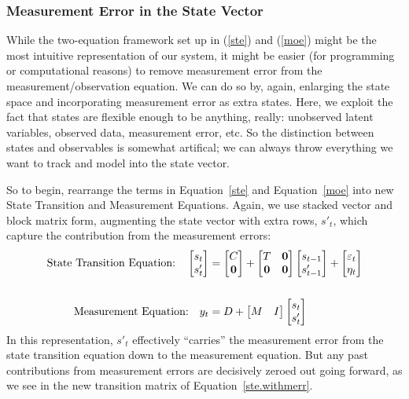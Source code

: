 \documentclass[a4paper,12pt]{article}
\begin{document}
\subsubsection{Measurement Error in the State Vector}

While the two-equation framework set up in (\ref{ste}) and (\ref{moe})
might be the most intuitive representation of our system, it might be
easier (for programming or computational reasons) to remove measurement
error from the measurement/observation equation. We can do so by, again,
enlarging the state space and incorporating measurement error as extra
states. Here, we exploit the fact that states are flexible enough to be
anything, really: unobserved latent variables, observed data,
measurement error, etc. So the distinction between states and
observables is somewhat artifical; we can always throw everything we
want to track and model into the state vector.

So to begin, rearrange the terms in Equation~\ref{ste} and
Equation~\ref{moe} into new State Transition and Measurement Equations.
Again, we use stacked vector and block matrix form, augmenting the state
vector with extra rows, $s'_t$, which capture the contribution from the
measurement errors:
\begin{align}
  \text{State Transition Equation:} \quad
    \begin{bmatrix} s_{t} \\ s'_t \end{bmatrix}
    &= \begin{bmatrix} C \\ \mathbf{0} \end{bmatrix}
    + \begin{bmatrix} T & \mathbf{0} \\
    \mathbf{0} & \mathbf{0} \end{bmatrix}
    \begin{bmatrix} s_{t-1} \\ s'_{t-1} \end{bmatrix}
    + \begin{bmatrix} \varepsilon_{t} \\ \eta_t \end{bmatrix}
    \label{ste.withmerr}
  \\ \notag \\
  \text{Measurement Equation:} \quad
    y_{t} &= D +
    \begin{bmatrix} M & I \end{bmatrix}
    \begin{bmatrix} s_{t} \\ s'_t \end{bmatrix}
\end{align}
In this representation, $s'_t$ effectively ``carries'' the measurement
error from the state transition equation down to the measurement
equation. But any past contributions from measurement errors are
decisively zeroed out going forward, as we see in the new transition
matrix of Equation~\ref{ste.withmerr}.
\end{document}
